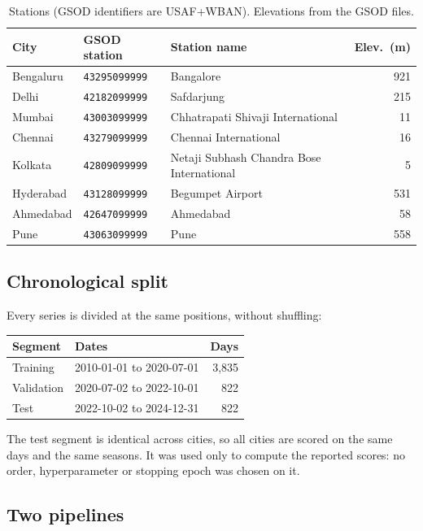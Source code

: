 \documentclass[11pt,a4paper]{article}
\newcommand{\code}[1]{\texttt{#1}}
\begin{document}
\begin{table}[ht]
\centering
\footnotesize
\caption{Stations (GSOD identifiers are USAF+WBAN). Elevations from the GSOD files.}
\label{tab:stations}
\begin{tabular}{@{}l l l r@{}}
\toprule
City & GSOD station & Station name & Elev.\ (m) \\
\midrule
Bengaluru & \code{43295099999} & Bangalore & 921 \\
Delhi & \code{42182099999} & Safdarjung & 215 \\
Mumbai & \code{43003099999} & Chhatrapati Shivaji International & 11 \\
Chennai & \code{43279099999} & Chennai International & 16 \\
Kolkata & \code{42809099999} & Netaji Subhash Chandra Bose International & 5 \\
Hyderabad & \code{43128099999} & Begumpet Airport & 531 \\
Ahmedabad & \code{42647099999} & Ahmedabad & 58 \\
Pune & \code{43063099999} & Pune & 558 \\
\bottomrule
\end{tabular}
\end{table}

\subsection{Chronological split}

Every series is divided at the same positions, without shuffling:
\begin{center}
\small
\begin{tabular}{@{}l l r@{}}
\toprule
Segment & Dates & Days \\
\midrule
Training & 2010-01-01 to 2020-07-01 & 3{,}835 \\
Validation & 2020-07-02 to 2022-10-01 & 822 \\
Test & 2022-10-02 to 2024-12-31 & 822 \\
\bottomrule
\end{tabular}
\end{center}
The test segment is identical across cities, so all cities are scored on the same days and the same seasons. It was used only to compute the reported scores: no order, hyperparameter or stopping epoch was chosen on it.

\subsection{Two pipelines}
\end{document}
